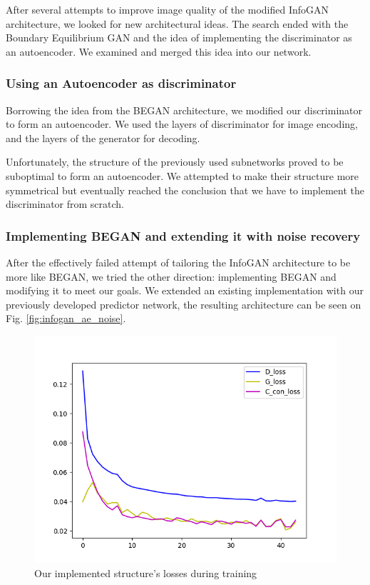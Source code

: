 \documentclass{egpubl}
\begin{document}
After several attempts to improve image quality of the modified InfoGAN architecture, %
we looked for new architectural ideas. The search ended with the Boundary Equilibrium GAN and the idea of implementing the discriminator as an autoencoder. We examined and merged this idea into our network.

\subsubsection{Using an Autoencoder as discriminator}

Borrowing the idea from the BEGAN architecture, %
we modified our discriminator to form an autoencoder. We used the layers of discriminator for image encoding, and the layers of the generator for decoding. 

Unfortunately, the structure of the previously used subnetworks proved to be suboptimal to form an autoencoder. We attempted to make their structure more symmetrical but eventually reached the conclusion that we have to implement the discriminator from scratch.

\subsubsection{Implementing BEGAN and extending it with noise recovery}

After the effectively failed attempt of tailoring the InfoGAN architecture to be more like BEGAN, we tried the other direction: implementing BEGAN and modifying it to meet our goals. We extended an existing implementation with our previously developed predictor network, the resulting architecture can be seen on Fig. \ref{fig:infogan_ae_noise}.

\begin{figure}[!htb]
	\centering
	\includegraphics[width=\linewidth]{pic/InfoBegan(proper)}
	\caption{Our implemented structure's losses during training}
\end{figure}
\end{document}
